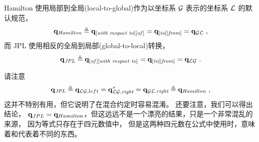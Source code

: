 Hamilton 使用局部到全局(local-to-global)作为以坐标系 $\mathcal{G}$ 表示的坐标系 $\mathcal{L}$ 的默认规范， 
%
\begin{align}
{\bf q}_{\textit{Hamilton}} \triangleq {\bf q}_{[\textit{with~respect~to}][\textit{of\,}]}={\bf q}_{[\textit{to}][\textit{from}]}={\bf q}_{\mathcal{G}\mathcal{L}}~, 
\end{align}
%
而 JPL 使用相反的全局到局部(global-to-local)转换，
%
\begin{align}
{\bf q}_{\textit{JPL}} \triangleq {\bf q}_{[\textit{of}\,][\textit{with~respect~to}]}={\bf q}_{[\textit{to}][\textit{from}]}={\bf q}_{\mathcal{L}\mathcal{G}}~.
\end{align}

请注意
%
\begin{align}
\bfq_{\textit{JPL}}
\triangleq    \bfq_{\cL\cG,left}
=    \bfq_{\cL\cG,\textit{right}}^*
=    \bfq_{\cG\cL,\textit{right}}
\triangleq    \bfq_{\textit{Hamilton}}%
~,
\label{equ:quatEquivalences}
\end{align}
%
这并不特别有用，但它说明了在混合约定时容易混淆。
还要注意，我们可以得出结论， ${\bf q}_{JPL} = {\bf q}_{Hamilton}$，但这远远不是一个漂亮的结果，只是一个非常混乱的来源， 
因为等式只存在于四元数值中， 
但是这两种四元数在公式中使用时，意味着和代表着不同的东西。




